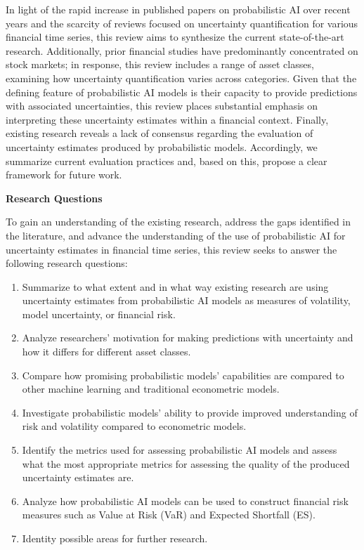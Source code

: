 In light of the rapid increase in published papers on probabilistic AI over recent years and the scarcity of reviews focused on uncertainty quantification for various financial time series, this review aims to synthesize the current state-of-the-art research. Additionally, prior financial studies have predominantly concentrated on stock markets; in response, this review includes a range of asset classes, examining how uncertainty quantification varies across categories. Given that the defining feature of probabilistic AI models is their capacity to provide predictions with associated uncertainties, this review places substantial emphasis on interpreting these uncertainty estimates within a financial context. Finally, existing research reveals a lack of consensus regarding the evaluation of uncertainty estimates produced by probabilistic models. Accordingly, we summarize current evaluation practices and, based on this, propose a clear framework for future work. 


\textbf{Research Questions}\nopagebreak

To gain an understanding of the existing research, address the gaps identified in the literature, and advance the understanding of the use of probabilistic AI for uncertainty estimates in financial time series, this review seeks to answer the following research questions: 
\begin{enumerate}[label=RQ\arabic*:]
    \item Summarize to what extent and in what way existing research are using uncertainty estimates from probabilistic AI models as measures of volatility, model uncertainty, or financial risk.
    \item Analyze researchers' motivation for making predictions with uncertainty and how it differs for different asset classes.
    \item Compare how promising probabilistic models' capabilities are compared to other machine learning and traditional econometric models.
    \item Investigate probabilistic models' ability to provide improved understanding of risk and volatility compared to econometric models.
    \item Identify the metrics used for assessing probabilistic AI models and assess what the most appropriate metrics for assessing the quality of the produced uncertainty estimates are.
    \item Analyze how probabilistic AI models can be used to construct financial risk measures such as Value at Risk (VaR) and Expected Shortfall (ES).
    \item Identity possible areas for further research.
\end{enumerate}

